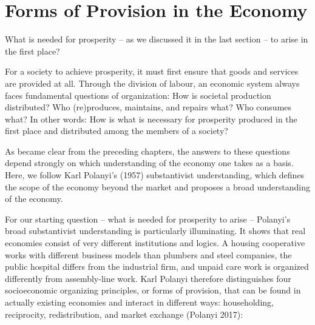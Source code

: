 \documentclass[
  british,
  a4paper,
  DIV=11,
  numbers=noendperiod,
  oneside,
  openany]{scrreprt}
\begin{document}
\section{Forms of Provision in the
Economy}\label{forms-of-provision-in-the-economy}

\begin{tcolorbox}[enhanced jigsaw, arc=.35mm, bottomrule=.15mm, bottomtitle=1mm, breakable, colback=white, colbacktitle=quarto-callout-note-color!10!white, colframe=quarto-callout-note-color-frame, coltitle=black, left=2mm, leftrule=.75mm, opacityback=0, opacitybacktitle=0.6, rightrule=.15mm, title={Guiding question}, titlerule=0mm, toprule=.15mm, toptitle=1mm]

What is needed for prosperity -- as we discussed it in the last section
-- to arise in the first place?

\end{tcolorbox}

For a society to achieve prosperity, it must first ensure that goods and
services are provided at all. Through the division of labour, an
economic system always faces fundamental questions of organization: How
is societal production distributed? Who (re)produces, maintains, and
repairs what? Who consumes what? In other words: How is what is
necessary for prosperity produced in the first place and distributed
among the members of a society?

As became clear from the preceding chapters, the answers to these
questions depend strongly on which understanding of the economy one
takes as a basis. Here, we follow Karl Polanyi's (1957) substantivist
understanding, which defines the scope of the economy beyond the market
and proposes a broad understanding of the economy.

For our starting question -- what is needed for prosperity to arise --
Polanyi's broad substantivist understanding is particularly
illuminating. It shows that real economies consist of very different
institutions and logics. A housing cooperative works with different
business models than plumbers and steel companies, the public hospital
differs from the industrial firm, and unpaid care work is organized
differently from assembly-line work. Karl Polanyi therefore
distinguishes four socioeconomic organizing principles, or forms of
provision, that can be found in actually existing economies and interact
in different ways: householding, reciprocity, redistribution, and market
exchange (Polanyi 2017):
\end{document}
